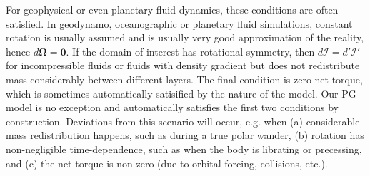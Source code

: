 For geophysical or even planetary fluid dynamics, these conditions are often satisfied. In geodynamo, oceanographic or planetary fluid simulations, constant rotation is usually assumed and is usually very good approximation of the reality, hence $d\boldsymbol{\Omega} = \mathbf{0}$. If the domain of interest has rotational symmetry, then $d\mathcal{I} = d'\mathcal{I}'$ for incompressible fluids or fluids with density gradient but does not redistribute mass considerably between different layers. The final condition is zero net torque, which is sometimes automatically satisified by the nature of the model. Our PG model is no exception and automatically satisfies the first two conditions by construction. Deviations from this scenario will occur, e.g. when (a) considerable mass redistribution happens, such as during a true polar wander, (b) rotation has non-negligible time-dependence, such as when the body is librating or precessing, and (c) the net torque is non-zero (due to orbital forcing, collisions, etc.).
